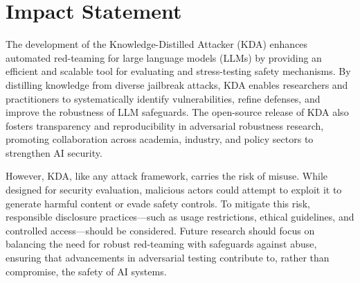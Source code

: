 \section*{Impact Statement}\label{sec:broader_impact}

The development of the Knowledge-Distilled Attacker (KDA) enhances automated red-teaming for large language models (LLMs) by providing an efficient and scalable tool for evaluating and stress-testing safety mechanisms. By distilling knowledge from diverse jailbreak attacks, KDA enables researchers and practitioners to systematically identify vulnerabilities, refine defenses, and improve the robustness of LLM safeguards. The open-source release of KDA also fosters transparency and reproducibility in adversarial robustness research, promoting collaboration across academia, industry, and policy sectors to strengthen AI security.

However, KDA, like any attack framework, carries the risk of misuse. While designed for security evaluation, malicious actors could attempt to exploit it to generate harmful content or evade safety controls. To mitigate this risk, responsible disclosure practices—such as usage restrictions, ethical guidelines, and controlled access—should be considered. Future research should focus on balancing the need for robust red-teaming with safeguards against abuse, ensuring that advancements in adversarial testing contribute to, rather than compromise, the safety of AI systems.

\newpage